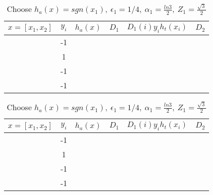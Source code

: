 \documentclass[11pt]{article}
\begin{document}
\begin{table}[H]
\centering
{\renewcommand{\arraystretch}{1.2}%
\begin{tabular}{| c | c | c | c | c | c |}
\hline
$x = [x_1, x_2]$& $y_i$ & $h_a(x)$ & $D_1$ & $D_1(i)y_ih_t(x_i)$ & $D_2$\\
\hline
[1,1] & -1 &  &  &  & \\ \hline
[1,-1] & 1 &  &  &  & \\ \hline
[-1,-1] & -1 &  & &  & \\ \hline
[-1,1] & -1 &  &  &  & \\ \hline
\end{tabular}}
\caption{Choose $h_a(x) = sgn(x_1), \ \epsilon_1 = 1/4, \ \alpha_1 = \frac{ln3}{2}, \ Z_1 = \frac{\sqrt{3}}{2}$}
\end{table}

\begin{table}[H]
\centering
{\renewcommand{\arraystretch}{1.2}%
\begin{tabular}{| c | c | c | c | c | c |}
\hline
$x = [x_1, x_2]$& $y_i$ & $h_a(x)$ & $D_1$ & $D_1(i)y_ih_t(x_i)$ & $D_2$\\
\hline
[1,1] & -1 &  &  &  & \\ \hline
[1,-1] & 1 &  &  &  & \\ \hline
[-1,-1] & -1 &  & &  & \\ \hline
[-1,1] & -1 &  &  &  & \\ \hline
\end{tabular}}
\caption{Choose $h_a(x) = sgn(x_1), \ \epsilon_1 = 1/4, \ \alpha_1 = \frac{ln3}{2}, \ Z_1 = \frac{\sqrt{3}}{2}$}
\end{table}
\end{document}
